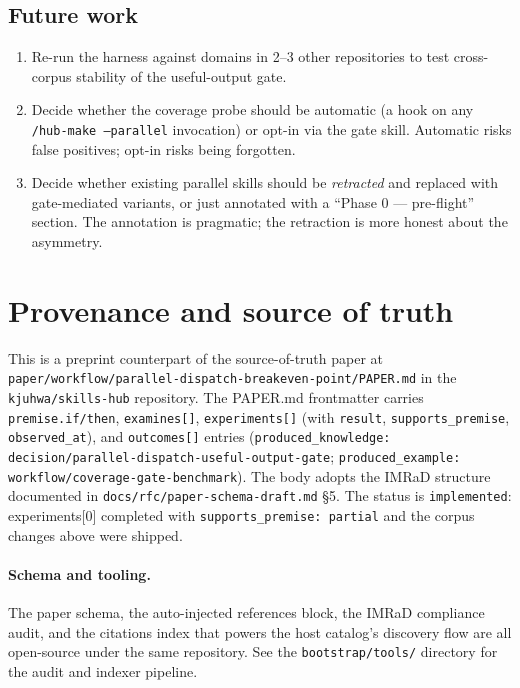 \documentclass[10pt,letterpaper]{article}
\begin{document}
\subsection{Future work}

\begin{enumerate}
\item Re-run the harness against domains in 2--3 other repositories to
  test cross-corpus stability of the useful-output gate.
\item Decide whether the coverage probe should be automatic (a hook on
  any \texttt{/hub-make --parallel} invocation) or opt-in via the gate
  skill. Automatic risks false positives; opt-in risks being forgotten.
\item Decide whether existing parallel skills should be \emph{retracted}
  and replaced with gate-mediated variants, or just annotated with a
  ``Phase 0 --- pre-flight'' section. The annotation is pragmatic; the
  retraction is more honest about the asymmetry.
\end{enumerate}

\section*{Provenance and source of truth}

This is a preprint counterpart of the source-of-truth paper at\\
\texttt{paper/workflow/parallel-dispatch-breakeven-point/PAPER.md} in the
\texttt{kjuhwa/skills-hub} repository. The PAPER.md frontmatter carries
\texttt{premise.if/then}, \texttt{examines[]}, \texttt{experiments[]} (with
\texttt{result}, \texttt{supports\_premise}, \texttt{observed\_at}), and
\texttt{outcomes[]} entries (\texttt{produced\_knowledge:
decision/parallel-dispatch-useful-output-gate};
\texttt{produced\_example: workflow/coverage-gate-benchmark}).
The body adopts the IMRaD structure documented in
\texttt{docs/rfc/paper-schema-draft.md} \S 5. The status is
\texttt{implemented}: experiments[0] completed with
\texttt{supports\_premise: partial} and the corpus changes above were
shipped.

\paragraph{Schema and tooling.}
The paper schema, the auto-injected references block, the IMRaD
compliance audit, and the citations index that powers the host catalog's
discovery flow are all open-source under the same repository. See the
\texttt{bootstrap/tools/} directory for the audit and indexer pipeline.



\end{document}
